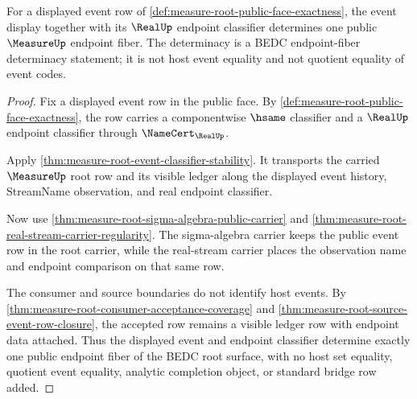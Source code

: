 \begin{theorem}
\label{thm:measure-root-public-face-determinacy}
For a displayed event row of
\autoref{def:measure-root-public-face-exactness}, the event display together
with its $\RealUp$ endpoint classifier determines one public $\MeasureUp$
endpoint fiber. The determinacy is a BEDC endpoint-fiber determinacy statement;
it is not host event equality and not quotient equality of event codes.
\end{theorem}
\begin{proof}
Fix a displayed event row in the public face. By
\autoref{def:measure-root-public-face-exactness}, the row carries a
componentwise $\hsame$ classifier and a $\RealUp$ endpoint classifier through
$\NameCert_{\RealUp}$.

Apply \autoref{thm:measure-root-event-classifier-stability}. It transports
the carried $\MeasureUp$ root row and its visible ledger along the displayed
event history, StreamName observation, and real endpoint classifier.

Now use \autoref{thm:measure-root-sigma-algebra-public-carrier} and
\autoref{thm:measure-root-real-stream-carrier-regularity}. The sigma-algebra
carrier keeps the public event row in the root carrier, while the real-stream
carrier places the observation name and endpoint comparison on that same row.

The consumer and source boundaries do not identify host events. By
\autoref{thm:measure-root-consumer-acceptance-coverage} and
\autoref{thm:measure-root-source-event-row-closure}, the accepted row remains
a visible ledger row with endpoint data attached. Thus the displayed event
and endpoint classifier determine exactly one public endpoint fiber of the
BEDC root surface, with no host set equality, quotient event equality,
analytic completion object, or standard bridge row added.
\end{proof}

